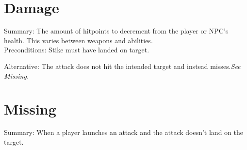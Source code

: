 \documentclass{report}
\begin{document}
    \section{Damage}
    Summary: The amount of hitpoints to decrement from the player or NPC's health. This varies between weapons and abilities.\\
    
    Preconditions: Stike must have landed on target.
    
    Alternative: The attack does not hit the intended target and instead misses.\textit{See Missing.}
    
    \section{Missing}
    Summary: When a player launches an attack and the attack doesn't land on the target.\\
    
\end{document}
